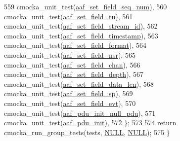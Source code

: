 \begin{DoxyCode}
559         cmocka\_unit\_test(\hyperlink{test-aaf_8c_a3ef0979d20c864d7c44597569c03719d}{aaf\_set\_field\_seq\_num}),
560         cmocka\_unit\_test(\hyperlink{test-aaf_8c_af3d13d9b438f94d297c2477f60a695e2}{aaf\_set\_field\_tu}),
561         cmocka\_unit\_test(\hyperlink{test-aaf_8c_a220bbb89231eeeb8ac6b32a062e20ddf}{aaf\_set\_field\_stream\_id}),
562         cmocka\_unit\_test(\hyperlink{test-aaf_8c_afb76b623dfe83b5e3e96025c6048a35f}{aaf\_set\_field\_timestamp}),
563         cmocka\_unit\_test(\hyperlink{test-aaf_8c_af955f649a35a432b13f1093958b9bd15}{aaf\_set\_field\_format}),
564         cmocka\_unit\_test(\hyperlink{test-aaf_8c_a1b1fb64121acddf2ffee6b7ea5885780}{aaf\_set\_field\_nsr}),
565         cmocka\_unit\_test(\hyperlink{test-aaf_8c_ab712c19d84a25bad079fcecde8946da3}{aaf\_set\_field\_chan}),
566         cmocka\_unit\_test(\hyperlink{test-aaf_8c_a028591d8c830fc2bb65cc9eb3a20f189}{aaf\_set\_field\_depth}),
567         cmocka\_unit\_test(\hyperlink{test-aaf_8c_ae0bfcb39a7706b19ddc06de92b4e244f}{aaf\_set\_field\_data\_len}),
568         cmocka\_unit\_test(\hyperlink{test-aaf_8c_a3c314045d45a46992a9e96877febd815}{aaf\_set\_field\_sp}),
569         cmocka\_unit\_test(\hyperlink{test-aaf_8c_aa37b0ed586a6714575652fcd84974d32}{aaf\_set\_field\_evt}),
570         cmocka\_unit\_test(\hyperlink{test-aaf_8c_abf07e2c924ffb1861fe0efd68a644b3f}{aaf\_pdu\_init\_null\_pdu}),
571         cmocka\_unit\_test(\hyperlink{test-aaf_8c_a2716e469521bfabeeb359433f2eaa4f3}{aaf\_pdu\_init}),
572     \};
573 
574     \textcolor{keywordflow}{return} cmocka\_run\_group\_tests(tests, \hyperlink{openavb__types__base__pub_8h_a070d2ce7b6bb7e5c05602aa8c308d0c4}{NULL}, \hyperlink{openavb__types__base__pub_8h_a070d2ce7b6bb7e5c05602aa8c308d0c4}{NULL});
575 \}
\end{DoxyCode}


